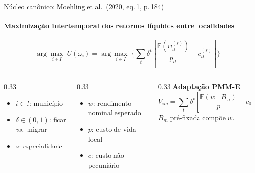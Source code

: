 \documentclass[10pt,aspectratio=169]{beamer}
\begin{document}
\begin{frame}{Núcleo canônico: Moehling et al.\ (2020, eq.\,1, p.\,184)}
\framesubtitle{Maximização intertemporal dos retornos líquidos entre localidades}
\begin{equation*}
\arg\max_{i \in I}\; U(\omega_i)
=
\arg\max_{i \in I}\;
\Biggl\{
\sum_{t} \delta^{t}
\left[
\frac{\mathbb{E}\!\left(w_{it}^{(s)}\right)}{p_{it}}
- c_{it}^{(s)}
\right]
\Biggr\}
\end{equation*}
\begin{columns}[T]
\begin{column}{0.33\textwidth}
\begin{itemize}
  \item $i \in I$: município
  \item $\delta \in (0,1)$: ficar \emph{vs.}\ migrar
  \item $s$: especialidade
\end{itemize}
\end{column}
\begin{column}{0.33\textwidth}
\begin{itemize}
  \item $w$: rendimento nominal esperado
  \item $p$: custo de vida local
  \item $c$: custo não-pecuniário
\end{itemize}
\end{column}
\begin{column}{0.33\textwidth}
\textbf{Adaptação PMM-E}
\begin{equation*}
V_{im} = \sum_t \delta^t\!\left[\frac{\mathbb{E}(w \mid B_m)}{p} - c_0(\text{IVS}_m)\right] + \varepsilon_{im}
\end{equation*}
$B_m$ pré-fixada compõe $w$.
\end{column}
\end{columns}
\end{frame}
\end{document}
